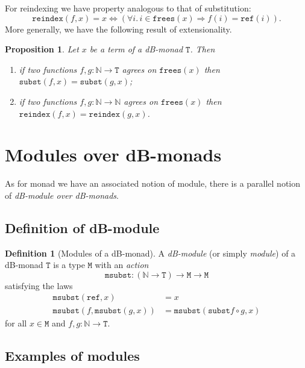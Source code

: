 \documentclass[a4paper,twoside,12pt,draft]{article}
\newtheorem{proposition}{Proposition}
\theoremstyle{definition}
\newtheorem{definition}{Definition}
\theoremstyle{remark}
\newcommand{\NN}{\mathbb{N}}
\newcommand{\TT}{\mathtt{T}}
\newcommand{\MM}{\mathtt{M}}
\newcommand{\subst}{\mathtt{subst}}
\newcommand{\refe}{\mathtt{ref}}
\newcommand{\frees}{\mathtt{frees}}
\newcommand{\reindex}{\mathtt{reindex}}
\newcommand{\msubst}{\mathtt{msubst}}
\begin{document}
For reindexing we have property analogous to that of substitution:
\begin{equation*}
  \reindex(f,x) = x \Longleftrightarrow
  (\forall i.\, i \in \mathtt{frees}(x) \Longrightarrow f(i) = \refe(i)).
\end{equation*}
More generally, we have the following result of extensionality.
\begin{proposition}
  Let $x$ be a term of a dB-monad $\TT$.  Then
  \begin{enumerate}
  \item if two functions $f,g\colon \NN\to \TT$ agrees on $\frees(x)$
    then $\subst(f,x) = \subst(g,x)$;
  \item if two functions $f,g\colon \NN\to \NN$ agrees on $\frees(x)$
    then $\reindex(f,x) = \reindex(g,x)$.
  \end{enumerate}
\end{proposition}

\section{Modules over dB-monads}
\label{sec:modules}

As for monad we have an associated notion of module, there is a
parallel notion of \emph{dB-module over dB-monads}.

\subsection{Definition of dB-module}
\label{sec:definition-module}

\begin{definition}[Modules of a dB-monad]
  A \emph{dB-module} (or simply \emph{module}) of a dB-monad $\TT$ is
  a type $\MM$ with an \emph{action}
  \begin{equation*}
    \msubst\colon (\NN\to \TT) \to \MM \to \MM
  \end{equation*}
  satisfying the laws
  \begin{align*}
    \msubst(\refe,x) &= x\\
    \msubst(f,\msubst(g,x)) &= \msubst(\subst f \circ g, x)
  \end{align*}
  for all $x\in \MM$ and $f,g\colon \NN \to \TT$.
\end{definition}

\subsection{Examples of modules}
\label{sec:examples-modules}
\end{document}
